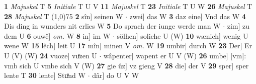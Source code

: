 \documentclass[8pt,a4paper,notitlepage]{article}
\begin{document}
\begin{table}[ht]
\begin{minipage}[t]{0.5\linewidth}
\textbf{1} \textit{Majuskel} T  \textbf{5} \textit{Initiale} T U V  \textbf{11} \textit{Majuskel} T  \textbf{23} \textit{Initiale} T U W  \textbf{26} \textit{Majuskel} T  \textbf{28} \textit{Majuskel} T  \newline
\line(1,0){75} \newline
\textbf{2} sîn] seinen W  $\cdot$ zwei] das W \textbf{3} daz eine] Vnd das W \textbf{4} Dis ding in wunders nit erlies W \textbf{5} Do sprach der iunge werde man W  $\cdot$ zim] zu dem U \textbf{6} ouwê] \textit{om.} W \textbf{8} in] im W  $\cdot$ sölhen] soliche U (W) \textbf{10} wænich] wenig U wene W \textbf{15} lêch] leit U \textbf{17} mîn] minen V \textit{om.} W \textbf{19} umbir] durch W \textbf{23} Der] Er U (V) (W) \textbf{24} vuoze] vuͦzen U  $\cdot$ wâpenter] wapent er U V (W) \textbf{26} umbe] [vm]: vmb sich U vmbe sich V (W) \textbf{27} gie ûz] vz gieng V \textbf{28} die] der V \textbf{29} sper] sper lente T \textbf{30} lente] Stuͦnd W  $\cdot$ dâr] do U V W \newline
\end{minipage}
\end{table}
\end{document}
